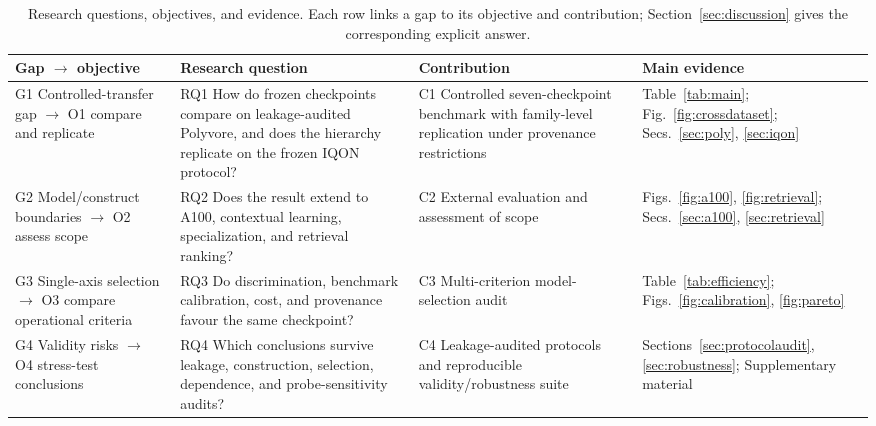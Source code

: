 \begin{table}[htbp]
\caption{Research questions, objectives, and evidence. Each row links a gap to its objective and contribution; Section~\ref{sec:discussion} gives the corresponding explicit answer.}
\label{tab:framework}
\centering\footnotesize
\setlength{\tabcolsep}{4pt}\renewcommand{\arraystretch}{1.12}
\begin{tabularx}{\textwidth}{@{}>{\raggedright\arraybackslash}p{}>{\raggedright\arraybackslash}p{}>{\raggedright\arraybackslash}p{}>{\raggedright\arraybackslash}X@{}}
\toprule
Gap $\rightarrow$ objective & Research question & Contribution & Main evidence \\
\midrule
G1 Controlled-transfer gap $\rightarrow$ O1 compare and replicate & RQ1 How do frozen checkpoints compare on leakage-audited Polyvore, and does the hierarchy replicate on the frozen IQON protocol? & C1 Controlled seven-checkpoint benchmark with family-level replication under provenance restrictions & Table~\ref{tab:main}; Fig.~\ref{fig:crossdataset}; Secs.~\ref{sec:poly}, \ref{sec:iqon} \\
G2 Model/construct boundaries $\rightarrow$ O2 assess scope & RQ2 Does the result extend to A100, contextual learning, specialization, and retrieval ranking? & C2 External evaluation and assessment of scope & Figs.~\ref{fig:a100}, \ref{fig:retrieval}; Secs.~\ref{sec:a100}, \ref{sec:retrieval} \\
G3 Single-axis selection $\rightarrow$ O3 compare operational criteria & RQ3 Do discrimination, benchmark calibration, cost, and provenance favour the same checkpoint? & C3 Multi-criterion model-selection audit & Table~\ref{tab:efficiency}; Figs.~\ref{fig:calibration}, \ref{fig:pareto} \\
G4 Validity risks $\rightarrow$ O4 stress-test conclusions & RQ4 Which conclusions survive leakage, construction, selection, dependence, and probe-sensitivity audits? & C4 Leakage-audited protocols and reproducible validity/robustness suite & Sections~\ref{sec:protocolaudit}, \ref{sec:robustness}; Supplementary material \\
\bottomrule
\end{tabularx}
\end{table}
